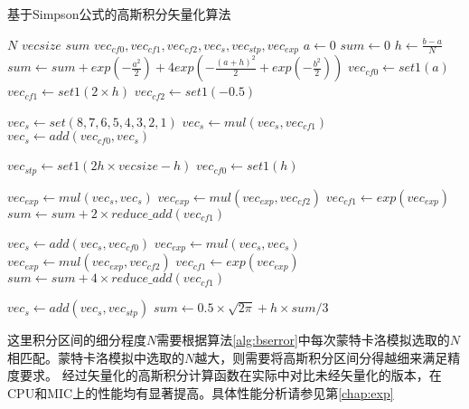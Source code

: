 \begin{algorithm}
  \caption{基于Simpson公式的高斯积分矢量化算法}
  \label{alg:simpson_par}
  \begin{algorithmic}[1]
    \Require $N$ 
    \Require $vecsize$ 
    \Ensure $sum$
    \State $vec_{cf0}, vec_{cf1}, vec_{cf2}, vec_{s}, vec_{stp}, vec_{exp}$
    \State $a \gets 0$
    \State $sum \gets 0$
    \State $h \gets \frac{b-a}{N}$
    \State $sum \gets sum + exp(-\frac{a^2}{2}) + 4exp(-\frac{(a+h)^2}{2} + exp(-\frac{b^2}{2}))$
    \State $vec_{cf0} \gets set1(a)$ 
    \State $vec_{cf1} \gets set1(2\times h)$ 
    \State $vec_{cf2} \gets set1(-0.5)$ 

    \State $vec_{s} \gets set(8,7,6,5,4,3,2,1)$ 
    \State $vec_{s} \gets mul(vec_s, vec_{cf1})$ 
    \State $vec_{s} \gets add(vec_{cf0}, vec_s)$ 
    
    \State $vec_{stp} \gets set1(2h\times vecsize - h)$ 
    \State $vec_{cf0} \gets set1(h)$ 

    \State $vec_{exp} \gets mul(vec_s, vec_s)$
    \State $vec_{exp} \gets mul(vec_{exp}, vec_{cf2})$
    \State $vec_{cf1} \gets exp(vec_{exp})$
    \State $sum \gets sum + 2\times reduce\_add(vec_{cf1})$
    
    \State $vec_{s} \gets add(vec_{s}, vec_{cf0})$ 
    \State $vec_{exp} \gets mul(vec_{s}, vec_{s})$ 
    \State $vec_{exp} \gets mul(vec_{exp}, vec_{cf2})$ 
    \State $vec_{cf1} \gets exp(vec_{exp})$
    \State $sum \gets sum + 4\times reduce\_add(vec_{cf1})$

    \State $vec_{s} \gets add(vec_{s}, vec_{stp})$ 
    \EndFor
    \State $sum \gets 0.5\times \sqrt{2\pi} + h\times sum/3$
    \EndProcedure
  \end{algorithmic}
\end{algorithm}

这里积分区间的细分程度$N$需要根据算法\ref{alg:bserror}中每次蒙特卡洛模拟选取的$N$相匹配。蒙特卡洛模拟中选取的$N$越大，则需要将高斯积分区间分得越细来满足精度要求。
经过矢量化的高斯积分计算函数在实际中对比未经矢量化的版本，在CPU和MIC上的性能均有显著提高。具体性能分析请参见第\ref{chap:exp}



